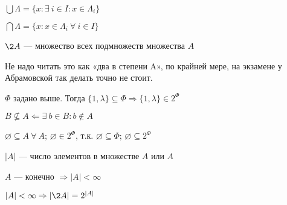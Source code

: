 \begin{sh-designation}
    $\bigcup \Lambda = \{x: \exists ~i \in I: x \in \Lambda_i\}$
\end{sh-designation}

\begin{sh-designation}
    $\bigcap \Lambda = \{x: x \in \Lambda_i ~\forall ~i \in I\}$
\end{sh-designation}

\begin{sh-designation}
    $\2{A}$ — множество всех подмножеств множества $A$
\end{sh-designation}

\begin{remark}
    Не надо читать это как «два в степени A», по крайней мере, на экзамене у Абрамовской так делать точно не стоит.
\end{remark}

\begin{sh-example}
    $\Phi$ задано выше. Тогда $\{1, \lambda\} \subseteq \Phi \Rightarrow \{1, \lambda\} \in 2^\Phi$
\end{sh-example}

\begin{sh-designation}
    $B \not\subseteq A \Leftarrow \exists ~b \in B: b \notin A$
\end{sh-designation}

\begin{remark}
    $\varnothing \subseteq A ~\forall ~A$; $\varnothing \in 2^\Phi$, т.к. $\varnothing \subseteq \Phi$; $\varnothing \subseteq 2^\Phi$
\end{remark}

\begin{definition}
    $\left|A\right|$ — число элементов в множестве $A$ или  $A$
\end{definition}

\begin{sh-designation}
    $A$ — конечно $\Rightarrow \left|A\right| < \infty$
\end{sh-designation}

\begin{sh-proposition}
    $|A| < \infty \Rightarrow \left|\2{A}\right|=2^{\left|A\right|}$
\end{sh-proposition}

